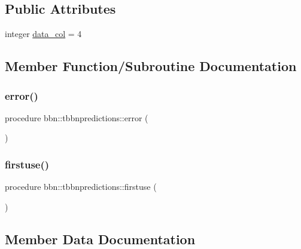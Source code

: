 \subsection*{Public Attributes}
\begin{DoxyCompactItemize}
\item 
integer \mbox{\hyperlink{structbbn_1_1tbbnpredictions_a09cd87dcdff9ff7b156cdfd72d441580}{data\+\_\+col}} = 4
\end{DoxyCompactItemize}


\subsection{Member Function/\+Subroutine Documentation}
\mbox{\label{structbbn_1_1tbbnpredictions_a6f001a3c82e2abe3d9004fc767b1a9cd}} 
\subsubsection{\texorpdfstring{error()}{error()}}
{\footnotesize\ttfamily procedure bbn\+::tbbnpredictions\+::error (\begin{DoxyParamCaption}{ }\end{DoxyParamCaption})}

\mbox{\label{structbbn_1_1tbbnpredictions_a6c746e607e29abb7cbb5f79665bd8b12}} 
\subsubsection{\texorpdfstring{firstuse()}{firstuse()}}
{\footnotesize\ttfamily procedure bbn\+::tbbnpredictions\+::firstuse (\begin{DoxyParamCaption}{ }\end{DoxyParamCaption})}



\subsection{Member Data Documentation}
\mbox{\label{structbbn_1_1tbbnpredictions_a09cd87dcdff9ff7b156cdfd72d441580}} 
